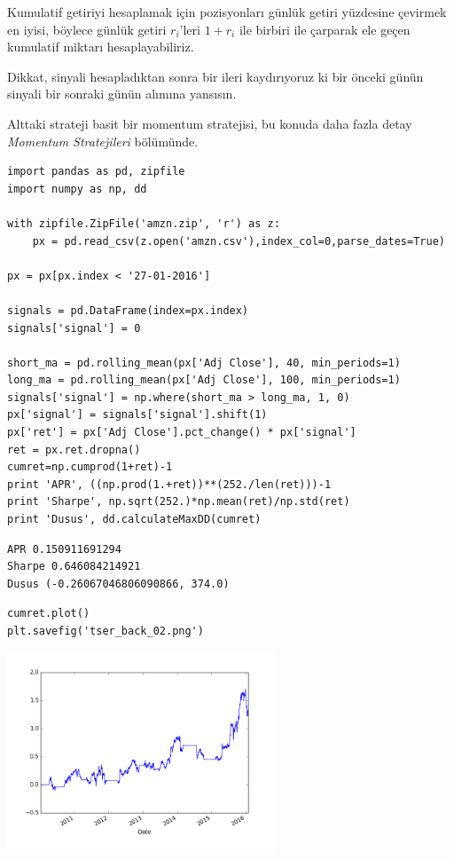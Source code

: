 \documentclass[12pt,fleqn]{article}\usepackage{../../common}
\begin{document}
Kumulatif getiriyi hesaplamak için pozisyonları günlük getiri yüzdesine çevirmek
en iyisi, böylece günlük getiri $r_i$'leri $1+r_i$ ile birbiri ile çarparak ele
geçen kumulatif miktarı hesaplayabiliriz.

Dikkat, sinyali hesapladıktan sonra bir ileri kaydırıyoruz ki bir önceki günün
sinyali bir sonraki günün alımına yansısın.

Alttaki strateji basit bir momentum stratejisi, bu konuda daha fazla detay {\em
  Momentum Stratejileri} bölümünde.

\begin{verbatim}
import pandas as pd, zipfile
import numpy as np, dd

with zipfile.ZipFile('amzn.zip', 'r') as z:
    px = pd.read_csv(z.open('amzn.csv'),index_col=0,parse_dates=True)

px = px[px.index < '27-01-2016']

signals = pd.DataFrame(index=px.index) 
signals['signal'] = 0 

short_ma = pd.rolling_mean(px['Adj Close'], 40, min_periods=1) 
long_ma = pd.rolling_mean(px['Adj Close'], 100, min_periods=1) 
signals['signal'] = np.where(short_ma > long_ma, 1, 0) 
px['signal'] = signals['signal'].shift(1) 
px['ret'] = px['Adj Close'].pct_change() * px['signal']
ret = px.ret.dropna()
cumret=np.cumprod(1+ret)-1
print 'APR', ((np.prod(1.+ret))**(252./len(ret)))-1
print 'Sharpe', np.sqrt(252.)*np.mean(ret)/np.std(ret)
print 'Dusus', dd.calculateMaxDD(cumret)
\end{verbatim}

\begin{verbatim}
APR 0.150911691294
Sharpe 0.646084214921
Dusus (-0.26067046806090866, 374.0)
\end{verbatim}

\begin{verbatim}
cumret.plot()
plt.savefig('tser_back_02.png')
\end{verbatim}

\includegraphics[height=6cm]{tser_back_02.png}
\end{document}
